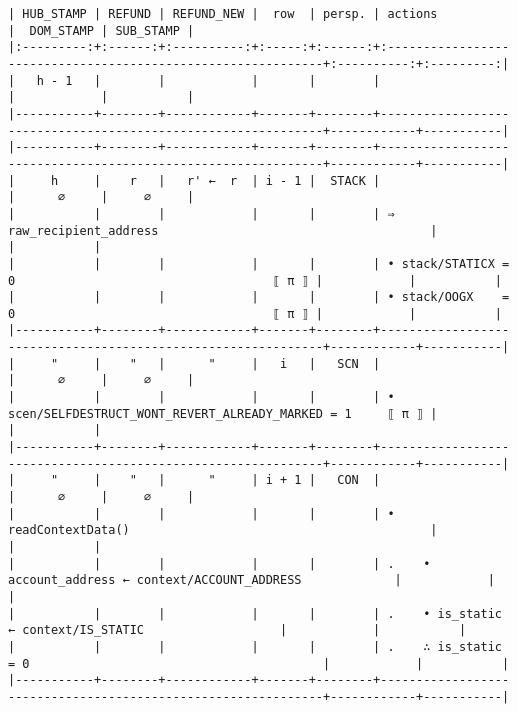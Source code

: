 \documentclass[varwidth=\maxdimen,margin=0.5cm,multi={verbatim}]{standalone}
\begin{document}
\begin{verbatim}
| HUB_STAMP | REFUND | REFUND_NEW |  row  | persp. | actions                                                      |  DOM_STAMP | SUB_STAMP |
|:---------:+:------:+:----------:+:-----:+:------:+:-------------------------------------------------------------+:----------:+:---------:|
|   h - 1   |        |            |       |        |                                                              |            |           |
|-----------+--------+------------+-------+--------+--------------------------------------------------------------+------------+-----------|
|-----------+--------+------------+-------+--------+--------------------------------------------------------------+------------+-----------|
|     h     |    r   |   r' ←  r  | i - 1 |  STACK |                                                              |      ∅     |     ∅     |
|           |        |            |       |        | ⇒ raw_recipient_address                                      |            |           |
|           |        |            |       |        | • stack/STATICX = 0                                    ⟦ π ⟧ |            |           |
|           |        |            |       |        | • stack/OOGX    = 0                                    ⟦ π ⟧ |            |           |
|-----------+--------+------------+-------+--------+--------------------------------------------------------------+------------+-----------|
|     "     |    "   |      "     |   i   |   SCN  |                                                              |      ∅     |     ∅     |
|           |        |            |       |        | • scen/SELFDESTRUCT_WONT_REVERT_ALREADY_MARKED = 1     ⟦ π ⟧ |            |           |
|-----------+--------+------------+-------+--------+--------------------------------------------------------------+------------+-----------|
|     "     |    "   |      "     | i + 1 |   CON  |                                                              |      ∅     |     ∅     |
|           |        |            |       |        | • readContextData()                                          |            |           |
|           |        |            |       |        | .    • account_address ← context/ACCOUNT_ADDRESS             |            |           |
|           |        |            |       |        | .    • is_static       ← context/IS_STATIC                   |            |           |
|           |        |            |       |        | .    ∴ is_static = 0                                         |            |           |
|-----------+--------+------------+-------+--------+--------------------------------------------------------------+------------+-----------|

\end{verbatim}
\end{document}
